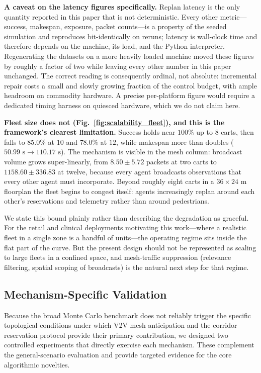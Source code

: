 \documentclass[journal]{IEEEtran}
\begin{document}
\textbf{A caveat on the latency figures specifically.} Replan latency is the only quantity reported in this paper that is not deterministic. Every other metric---success, makespan, exposure, packet counts---is a property of the seeded simulation and reproduces bit-identically on reruns; latency is wall-clock time and therefore depends on the machine, its load, and the Python interpreter. Regenerating the datasets on a more heavily loaded machine moved these figures by roughly a factor of two while leaving every other number in this paper unchanged. The correct reading is consequently ordinal, not absolute: incremental repair costs a small and slowly growing fraction of the control budget, with ample headroom on commodity hardware. A precise per-platform figure would require a dedicated timing harness on quiesced hardware, which we do not claim here.

\textbf{Fleet size does not (Fig.~\ref{fig:scalability_fleet}), and this is the framework's clearest limitation.} Success holds near $100\%$ up to $8$ carts, then falls to $85.0\%$ at $10$ and $78.0\%$ at $12$, while makespan more than doubles ($50.99\text{ s} \to 110.17\text{ s}$). The mechanism is visible in the mesh column: broadcast volume grows super-linearly, from $8.50 \pm 5.72$ packets at two carts to $1158.60 \pm 336.83$ at twelve, because every agent broadcasts observations that every other agent must incorporate. Beyond roughly eight carts in a $36 \times 24\text{ m}$ floorplan the fleet begins to congest itself: agents increasingly replan around each other's reservations and telemetry rather than around pedestrians.

We state this bound plainly rather than describing the degradation as graceful. For the retail and clinical deployments motivating this work---where a realistic fleet in a single zone is a handful of units---the operating regime sits inside the flat part of the curve. But the present design should not be represented as scaling to large fleets in a confined space, and mesh-traffic suppression (relevance filtering, spatial scoping of broadcasts) is the natural next step for that regime.

\subsection{Mechanism-Specific Validation}
\label{sec:mechanism}
Because the broad Monte Carlo benchmark does not reliably trigger the specific topological conditions under which V2V mesh anticipation and the corridor reservation protocol provide their primary contribution, we designed two controlled experiments that directly exercise each mechanism. These complement the general-scenario evaluation and provide targeted evidence for the core algorithmic novelties.
\end{document}
